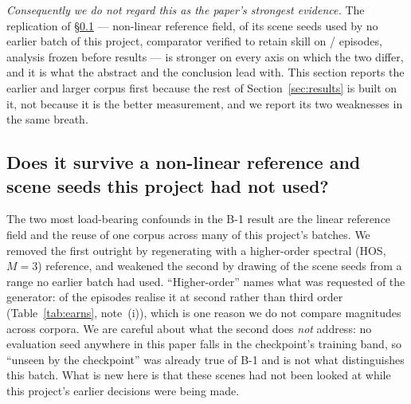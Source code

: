 \documentclass[review]{elsarticle}
\begin{document}
\emph{Consequently we do not regard this as the paper's strongest evidence.} The
replication of \S\ref{sec:res_hos} --- non-linear reference field,
\BTwelveFreshSeeds{} of its \BTwelveSeeds{} scene seeds used by no earlier batch of
this project, comparator verified to retain skill on
\BTwelveCmpBetter{}/\BTwelveCmpN{} episodes, analysis frozen before results --- is
stronger on every axis on which the two differ, and it is what the abstract and the
conclusion lead with.
This section reports the earlier and larger corpus first because the rest of
Section~\ref{sec:results} is built on it, not because it is the better measurement,
and we report its two weaknesses in the same breath.

\subsection{Does it survive a non-linear reference and scene seeds this project had not used?}
\label{sec:res_hos}

The two most load-bearing confounds in the B-1 result are the linear reference field
and the reuse of one corpus across many of this project's batches. We removed the
first outright by regenerating with a higher-order spectral (HOS, $M{=}3$) reference,
and weakened the second by drawing \BTwelveFreshSeeds{} of the \BTwelveSeeds{} scene
seeds from a range no earlier batch had used. ``Higher-order'' names what was
requested of the generator: \HosCrowdedDegraded{} of the \HosCrowdedN{} episodes
realise it at second rather than third order (Table~\ref{tab:earns}, note~(i)), which
is one reason we do not compare magnitudes across corpora. We are careful about what the second
does \emph{not} address: no evaluation seed anywhere in this paper falls in the
checkpoint's training band, so ``unseen by the checkpoint'' was already true of B-1
and is not what distinguishes this batch. What is new here is that these scenes had
not been looked at while this project's earlier decisions were being made.
\end{document}
